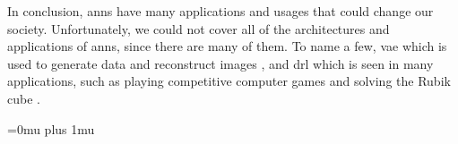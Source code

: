\documentclass[runningheads]{llncs}
\begin{document}
In conclusion, \gls{anns} have many applications and usages that 
could change our society.
Unfortunately, we could not cover all of the architectures and applications of \gls{anns},
since there are many of them. To name a few, \gls{vae} which is used to generate data and 
reconstruct images \cite{hou2017deep} \cite{yan2016attribute2image}, and 
\gls{drl} which is seen in many applications, such as playing competitive computer games \cite{berner2019dota} and solving the Rubik cube \cite{openairubikcube}.


















%
%
%
\Urlmuskip=0mu plus 1mu\relax


%





\end{document}
